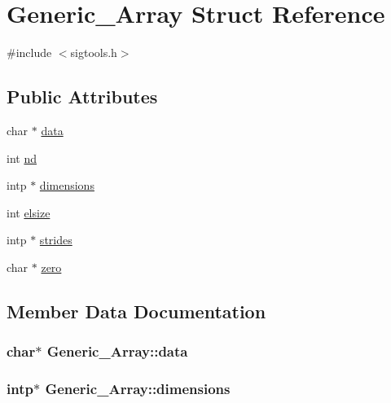 \hypertarget{structGeneric__Array}{}\section{Generic\+\_\+\+Array Struct Reference}
\label{structGeneric__Array}


{\ttfamily \#include $<$sigtools.\+h$>$}

\subsection*{Public Attributes}
\begin{DoxyCompactItemize}
\item 
char $\ast$ \hyperlink{structGeneric__Array_ad9ae9fc827e82b12decc6a5d42639463}{data}
\item 
int \hyperlink{structGeneric__Array_a5f2627cb8a3a968cf9a06bb0af53ebe3}{nd}
\item 
intp $\ast$ \hyperlink{structGeneric__Array_a6312bd75175903e0884db839ef3be575}{dimensions}
\item 
int \hyperlink{structGeneric__Array_a64232de3a28523eb62cc8caef59339c8}{elsize}
\item 
intp $\ast$ \hyperlink{structGeneric__Array_a1b1579ba03f4f63c37f91d14909a8204}{strides}
\item 
char $\ast$ \hyperlink{structGeneric__Array_aa70df67bcea3a7522111531684ba544c}{zero}
\end{DoxyCompactItemize}


\subsection{Member Data Documentation}
\hypertarget{structGeneric__Array_ad9ae9fc827e82b12decc6a5d42639463}{}
\subsubsection[{data}]{\setlength{\rightskip}{0pt plus 5cm}char$\ast$ Generic\+\_\+\+Array\+::data}\label{structGeneric__Array_ad9ae9fc827e82b12decc6a5d42639463}
\hypertarget{structGeneric__Array_a6312bd75175903e0884db839ef3be575}{}
\subsubsection[{dimensions}]{\setlength{\rightskip}{0pt plus 5cm}intp$\ast$ Generic\+\_\+\+Array\+::dimensions}\label{structGeneric__Array_a6312bd75175903e0884db839ef3be575}
\hypertarget{structGeneric__Array_a64232de3a28523eb62cc8caef59339c8}{}
